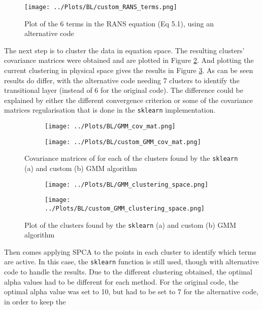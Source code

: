 \documentclass[12pt]{report} %
\begin{document}
\begin{figure}
  \centering
  \texttt{[image: ../Plots/BL/custom\_RANS\_terms.png]}
  \caption{Plot of the 6 terms in the RANS equation (Eq 5.1), using an alternative code}
  \label{fig:custom_RANS_terms}
\end{figure}

The next step is to cluster the data in equation space. The resulting clusters' covariance matrices were obtained and are plotted in Figure \ref{fig:custom_GMM_cov_mat}. And plotting the current clustering in physical space gives the results in Figure \ref{fig:GMM_clusters}. As can be seen results do differ, with the alternative code needing 7 clusters to identify the transitional layer (instead of 6 for the original code). The difference could be explained by either the different convergence criterion or some of the covariance matrices regularisation that is done in the \texttt{sklearn} implementation\cite{sklearnGMM}.

\begin{figure}
  \centering
  \begin{subfigure}[b]{0.7\textwidth}
      \texttt{[image: ../Plots/BL/GMM\_cov\_mat.png]}
      \caption{}
  \end{subfigure}
  \begin{subfigure}[b]{0.7\textwidth}
      \texttt{[image: ../Plots/BL/custom\_GMM\_cov\_mat.png]}
      \caption{}
  \end{subfigure}
  \caption{Covariance matrices of for each of the clusters found by the \texttt{sklearn} (a) and custom (b) GMM algorithm}
  \label{fig:custom_GMM_cov_mat}
\end{figure}


\begin{figure}
  \centering
  \begin{subfigure}[b]{0.7\textwidth}
      \texttt{[image: ../Plots/BL/GMM\_clustering\_space.png]}
      \caption{}
  \end{subfigure}
  \begin{subfigure}[b]{0.7\textwidth}
      \texttt{[image: ../Plots/BL/custom\_GMM\_clustering\_space.png]}
      \caption{}
  \end{subfigure}
  \caption{Plot of the clusters found by the \texttt{sklearn} (a) and custom (b) GMM algorithm}
  \label{fig:GMM_clusters}
\end{figure}

Then comes applying SPCA to the points in each cluster to identify which terms are active. In this case, the \texttt{sklearn} function is still used, though with alternative code to handle the results. Due to the different clustering obtained, the optimal alpha values had to be different for each method. For the original code, the optimal alpha value was set to 10, but had to be set to 7 for the alternative code, in order to keep the
\end{document}
